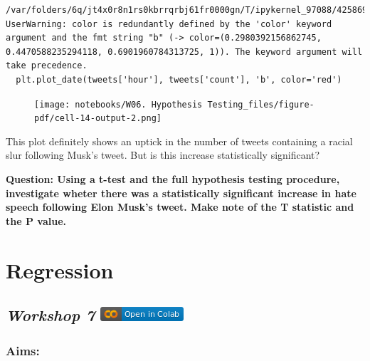 \documentclass[
  letterpaper,
  DIV=11,
  numbers=noendperiod]{scrreprt}
\begin{document}
\begin{verbatim}
/var/folders/6q/jt4x0r8n1rs0kbrrqrbj61fr0000gn/T/ipykernel_97088/4258694155.py:17: UserWarning: color is redundantly defined by the 'color' keyword argument and the fmt string "b" (-> color=(0.2980392156862745, 0.4470588235294118, 0.6901960784313725, 1)). The keyword argument will take precedence.
  plt.plot_date(tweets['hour'], tweets['count'], 'b', color='red')
\end{verbatim}

\begin{figure}[H]

{\centering \texttt{[image: notebooks/W06. Hypothesis Testing\_files/figure-pdf/cell-14-output-2.png]}

}

\end{figure}

This plot definitely shows an uptick in the number of tweets containing
a racial slur following Musk's tweet. But is this increase statistically
significant?

\textbf{Question: Using a t-test and the full hypothesis testing
procedure, investigate wheter there was a statistically significant
increase in hate speech following Elon Musk's tweet. Make note of the T
statistic and the P value.}


\hypertarget{regression}{%
\chapter{Regression}\label{regression}}

\hypertarget{workshop-7-open-in-colab}{%
\section[\emph{Workshop 7} ]{\texorpdfstring{\emph{Workshop 7}
\href{https://colab.research.google.com/github/oballinger/QM2/blob/main/notebooks/W07.\%20Linear\%20Regression.ipynb}{\protect\includegraphics{index_files/mediabag/colab-badge.png}}}{Workshop 7 Open In Colab}}\label{workshop-7-open-in-colab}}

\hypertarget{aims-5}{%
\subsection{Aims:}\label{aims-5}}
\end{document}
